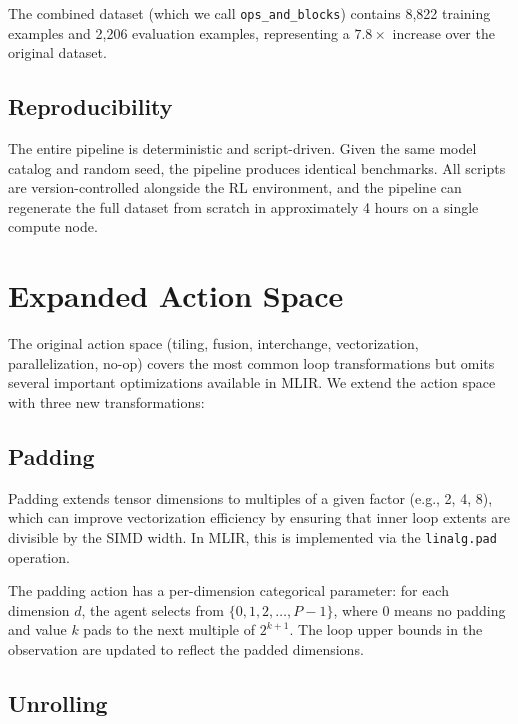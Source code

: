 \documentclass[10pt,twocolumn]{article}
\begin{document}
The combined dataset (which we call \texttt{ops\_and\_blocks}) contains 8,822 training examples and 2,206 evaluation examples, representing a $7.8\times$ increase over the original dataset.

\subsection{Reproducibility}

The entire pipeline is deterministic and script-driven. Given the same model catalog and random seed, the pipeline produces identical benchmarks. All scripts are version-controlled alongside the RL environment, and the pipeline can regenerate the full dataset from scratch in approximately 4 hours on a single compute node.

\section{Expanded Action Space}
\label{sec:expanded}

The original action space (tiling, fusion, interchange, vectorization, parallelization, no-op) covers the most common loop transformations but omits several important optimizations available in MLIR. We extend the action space with three new transformations:

\subsection{Padding}

Padding extends tensor dimensions to multiples of a given factor (e.g., 2, 4, 8), which can improve vectorization efficiency by ensuring that inner loop extents are divisible by the SIMD width. In MLIR, this is implemented via the \texttt{linalg.pad} operation.

The padding action has a per-dimension categorical parameter: for each dimension $d$, the agent selects from $\{0, 1, 2, \ldots, P-1\}$, where 0 means no padding and value $k$ pads to the next multiple of $2^{k+1}$. The loop upper bounds in the observation are updated to reflect the padded dimensions.

\subsection{Unrolling}
\end{document}
